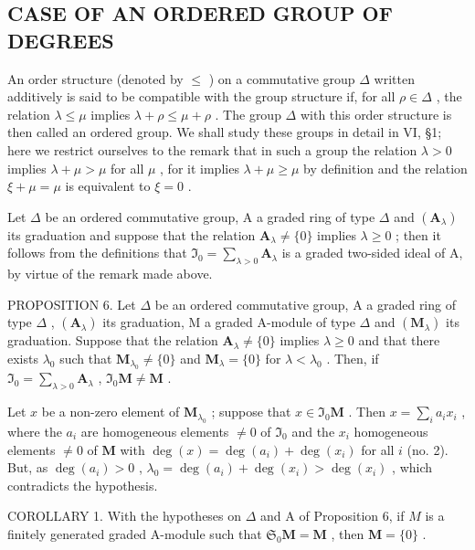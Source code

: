 \subsection{CASE OF AN ORDERED GROUP OF DEGREES}

An order structure (denoted by \(\leqslant\) ) on a commutative group \(\Delta\) written additively is said to be compatible with the group structure if, for all \(\rho\in\Delta\) , the relation \(\lambda\leqslant\mu\) implies \(\lambda+\rho\leqslant\mu+\rho\) . The group \(\Delta\) with this order structure is then called an ordered group. We shall study these groups in detail in VI, §1; here we restrict ourselves to the remark that in such a group the relation \(\lambda>0\) implies \(\lambda+\mu>\mu\) for all \(\mu\) , for it implies \(\lambda+\mu\geqslant\mu\) by definition and the relation \(\xi+\mu=\mu\) is equivalent to \(\xi=0\) .

Let \(\Delta\) be an ordered commutative group, A a graded ring of type \(\Delta\) and \((\mathbf{A}_{\lambda})\) its graduation and suppose that the relation \(\mathbf{A}_{\lambda} \neq \{0\}\) implies \(\lambda \geqslant 0\) ; then it follows from the definitions that \(\mathfrak{I}_0 = \sum_{\lambda > 0} \mathbf{A}_{\lambda}\) is a graded two-sided ideal of A, by virtue of the remark made above.

PROPOSITION 6. Let \(\Delta\) be an ordered commutative group, A a graded ring of type \(\Delta\) , \((\mathbf{A}_{\lambda})\) its graduation, M a graded A-module of type \(\Delta\) and \((\mathbf{M}_{\lambda})\) its graduation. Suppose that the relation \(\mathbf{A}_{\lambda} \neq \{0\}\) implies \(\lambda \geqslant 0\) and that there exists \(\lambda_0\) such that \(\mathbf{M}_{\lambda_0} \neq \{0\}\) and \(\mathbf{M}_{\lambda} = \{0\}\) for \(\lambda < \lambda_0\) . Then, if \(\Im_0 = \sum_{\lambda > 0} \mathbf{A}_{\lambda}\) , \(\Im_0 \mathbf{M} \neq \mathbf{M}\) .

Let \(x\) be a non-zero element of \(\mathbf{M}_{\lambda_0}\) ; suppose that \(x \in \mathfrak{I}_0\mathbf{M}\) . Then \(x = \sum_{i} a_i x_i\) , where the \(a_i\) are homogeneous elements \(\neq 0\) of \(\mathfrak{I}_0\) and the \(x_i\) homogeneous elements \(\neq 0\) of \(\mathbf{M}\) with \(\deg(x) = \deg(a_i) + \deg(x_i)\) for all \(i\) (no. 2). But, as \(\deg(a_i) > 0\) , \(\lambda_0 = \deg(a_i) + \deg(x_i) > \deg(x_i)\) , which contradicts the hypothesis.

COROLLARY 1. With the hypotheses on \(\Delta\) and A of Proposition 6, if \(M\) is a finitely generated graded A-module such that \(\mathfrak{S}_0\mathbf{M} = \mathbf{M}\) , then \(\mathbf{M} = \{0\}\) .

